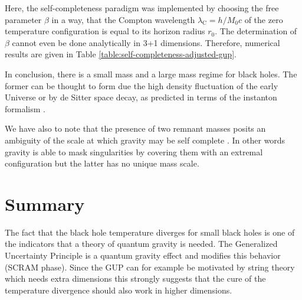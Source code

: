 Here, the self-completeness paradigm was implemented by choosing the free
parameter $\beta$ in a way, that the Compton wavelength
$\lambda_\text{C} = h/M_0c$ of the zero temperature configuration is equal
to its horizon radius $r_0$. The determination of $\beta$ cannot even be 
done analytically in 3+1 dimensions. Therefore, numerical results are
given in Table \ref{table:self-completeness-adjusted-gup}.



In conclusion, there is a small mass and a large mass regime for black holes. The former can be thought to form due the high density fluctuation of the early Universe \cite{CaH74} or by de Sitter space decay, as predicted in terms of the instanton formalism \cite{MaR95,BoH96,MaN11}.

We have also to note that the presence of two remnant masses posits an ambiguity of the scale at which gravity may be self complete \cite{MuN12,DFG11,DFG12,SpA11,Nic2018}. In other words gravity is able to mask singularities by covering them with an extremal configuration but the latter has no unique mass scale.


\section{Summary} %
The fact that the black hole temperature diverges for small black holes is one 
of the indicators that
a theory of quantum gravity is needed. The Generalized Uncertainty Principle is
a quantum gravity effect and modifies this behavior (SCRAM phase).
Since the GUP can for example be motivated by string theory which needs extra 
dimensions this strongly suggests
that the cure of the temperature divergence should also work in higher 
dimensions.

